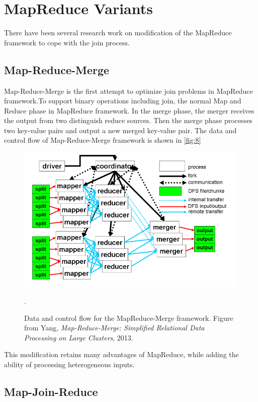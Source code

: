 \documentclass[sigconf, nonacm]{acmart}
\begin{document}
\section{MapReduce Variants}

There have been several research work on modification of the MapReduce framework to cope with the join process. 

\subsection{Map-Reduce-Merge}

Map-Reduce-Merge is the first attempt to optimize join problems in MapReduce framework\cite{10.1145/1247480.1247602}.To support binary operations including join, the normal Map and Reduce phase in MapReduce framework. In the merge phase, the merger receives the output from two distinguish reduce sources. Then the merge phase processes two key-value pairs and output a new merged key-value pair. The data and control flow of Map-Reduce-Merge framework is shown in \autoref{fig:8}

\begin{figure}[hbt!]
  \centering
  \includegraphics[width=\linewidth]{figures/8.png}
  \caption{Data and control flow for the MapReduce-Merge framework.  Figure from Yang, \textit{Map-Reduce-Merge: Simplified Relational Data Processing on Large Clusters}, 2013.}.
  \label{fig:8}
\end{figure}

This modification retains many advantages of MapReduce, while adding the ability of processing heterogeneous inputs. 

\subsection{Map-Join-Reduce}
\end{document}
